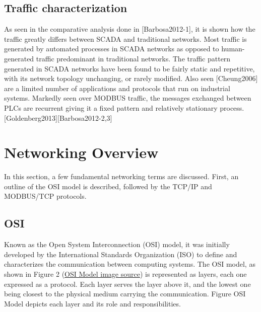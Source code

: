 \documentclass[12pt,]{article}
\begin{document}
\subsection{Traffic characterization}\label{traffic-characterization}

As seen in the comparative analysis done in {[}Barbosa2012-1{]}, it is
shown how the traffic greatly differs between SCADA and traditional
networks. Most traffic is generated by automated processes in SCADA
networks as opposed to human-generated traffic predominant in
traditional networks. The traffic pattern generated in SCADA networks
have been found to be fairly static and repetitive, with its network
topology unchanging, or rarely modified. Also seen {[}Cheung2006{]} are
a limited number of applications and protocols that run on industrial
systems. Markedly seen over MODBUS traffic, the messages exchanged
between PLCs are recurrent giving it a fixed pattern and relatively
stationary process.{[}Goldenberg2013{]}{[}Barbosa2012-2,3{]}

\pagebreak

\section{Networking Overview}\label{networking-overview}

In this section, a few fundamental networking terms are discussed.
First, an outline of the OSI model is described, followed by the TCP/IP
and MODBUS/TCP protocols.

\subsection{OSI}\label{osi}

Known as the Open System Interconnection (OSI) model, it was initially
developed by the International Standards Organization (ISO) to define
and characterizes the communication between computing systems. The OSI
model, as shown in Figure 2
(\href{https://engineering.linkedin.com/endorsements/geographic-trends-skills-using-linkedins-endorsement-feature}{OSI
Model image source}) is represented as layers, each one expressed as a
protocol. Each layer serves the layer above it, and the lowest one being
closest to the physical medium carrying the communication. Figure OSI
Model depicts each layer and its role and responsibilities.
\end{document}
